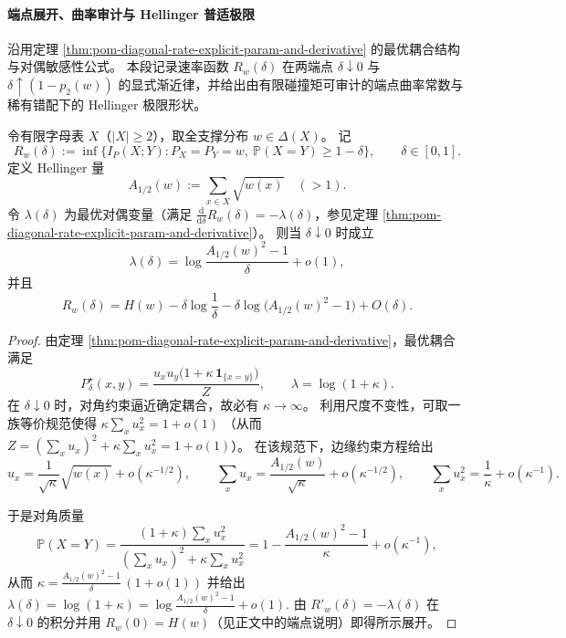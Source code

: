 
\paragraph{端点展开、曲率审计与 Hellinger 普适极限}
沿用定理 \ref{thm:pom-diagonal-rate-explicit-param-and-derivative} 的最优耦合结构与对偶敏感性公式。
本段记录速率函数 \(R_w(\delta)\) 在两端点 \(\delta\downarrow 0\) 与 \(\delta\uparrow (1-p_2(w))\) 的显式渐近律，并给出由有限碰撞矩可审计的端点曲率常数与稀有错配下的 Hellinger 极限形状。

\begin{theorem}\label{thm:pom-diagonal-rate-small-distortion-hellinger-endpoint}
令有限字母表 \(X\)（\(|X|\ge2\)），取全支撑分布 \(w\in\Delta(X)\)。
记
\[
R_w(\delta):=\inf\{I_P(X;Y):P_X=P_Y=w,\ \mathbb P(X=Y)\ge 1-\delta\},\qquad \delta\in[0,1].
\]
定义 Hellinger 量
\[
A_{1/2}(w):=\sum_{x\in X}\sqrt{w(x)}\quad(>1).
\]
令 \(\lambda(\delta)\) 为最优对偶变量（满足 \(\frac{\mathrm d}{\mathrm d\delta}R_w(\delta)=-\lambda(\delta)\)，参见定理 \ref{thm:pom-diagonal-rate-explicit-param-and-derivative}）。
则当 \(\delta\downarrow 0\) 时成立
\[
\lambda(\delta)=\log\frac{A_{1/2}(w)^2-1}{\delta}+o(1),
\]
并且
\[
R_w(\delta)
=H(w)-\delta\log\frac{1}{\delta}-\delta\log\bigl(A_{1/2}(w)^2-1\bigr)+O(\delta).
\]
\end{theorem}
\begin{proof}
由定理 \ref{thm:pom-diagonal-rate-explicit-param-and-derivative}，最优耦合满足
\[
P^\star_\delta(x,y)=\frac{u_xu_y\bigl(1+\kappa\,\mathbf 1_{\{x=y\}}\bigr)}{Z},
\qquad \lambda=\log(1+\kappa).
\]
在 \(\delta\downarrow 0\) 时，对角约束逼近确定耦合，故必有 \(\kappa\to\infty\)。
利用尺度不变性，可取一族等价规范使得
\(
\kappa\sum_x u_x^2=1+o(1)
\)
（从而 \(Z=(\sum_x u_x)^2+\kappa\sum_x u_x^2=1+o(1)\)）。
在该规范下，边缘约束方程给出
\[
u_x=\frac{1}{\sqrt{\kappa}}\sqrt{w(x)}+o(\kappa^{-1/2}),
\qquad
\sum_x u_x=\frac{A_{1/2}(w)}{\sqrt{\kappa}}+o(\kappa^{-1/2}),
\qquad
\sum_x u_x^2=\frac{1}{\kappa}+o(\kappa^{-1}).
\]

于是对角质量
\[
\mathbb P(X=Y)
=\frac{(1+\kappa)\sum_x u_x^2}{(\sum_x u_x)^2+\kappa\sum_x u_x^2}
=1-\frac{A_{1/2}(w)^2-1}{\kappa}+o(\kappa^{-1}),
\]
从而
\(
\kappa=\frac{A_{1/2}(w)^2-1}{\delta}\,(1+o(1))
\)
并给出
\(
\lambda(\delta)=\log(1+\kappa)=\log\frac{A_{1/2}(w)^2-1}{\delta}+o(1)
\).
由 \(R'_w(\delta)=-\lambda(\delta)\) 在 \(\delta\downarrow 0\) 的积分并用 \(R_w(0)=H(w)\)（见正文中的端点说明）即得所示展开。
\end{proof}


